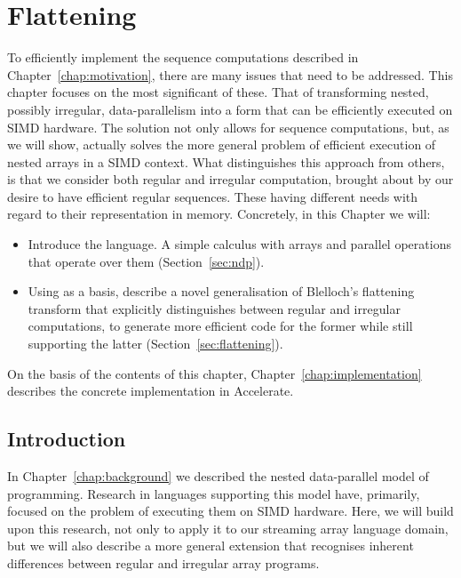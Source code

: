 \chapter{Flattening}%
\label{chap:theory}

To efficiently implement the sequence computations described in Chapter~\ref{chap:motivation}, there are many issues that need to be addressed. This chapter focuses on the most significant of these. That of transforming nested, possibly irregular, data-parallelism into a form that can be efficiently executed on SIMD hardware. The solution not only allows for sequence computations, but, as we will show, actually solves the more general problem of efficient execution of nested arrays in a SIMD context. What distinguishes this approach from others, is that we consider both regular and irregular computation, brought about by our desire to have efficient regular sequences. These having different needs with regard to their representation in memory. Concretely, in this Chapter we will:
%
\begin{itemize}
\item Introduce the \ndp{} language. A simple calculus with arrays and parallel operations that operate over them (Section~\ref{sec:ndp}).
\item Using \ndp{} as a basis, describe a novel generalisation of Blelloch's flattening transform that explicitly distinguishes between regular and irregular computations, to generate more efficient code for the former while still supporting the latter (Section~\ref{sec:flattening}).
\end{itemize}

On the basis of the contents of this chapter, Chapter~\ref{chap:implementation} describes the concrete implementation in Accelerate.

\section{Introduction}

In Chapter~\ref{chap:background} we described the nested data-parallel model of programming. Research in languages supporting this model have, primarily, focused on the problem of executing them on SIMD hardware. Here, we will build upon this research, not only to apply it to our streaming array language domain, but we will also describe a more general extension that recognises inherent differences between regular and irregular array programs.


